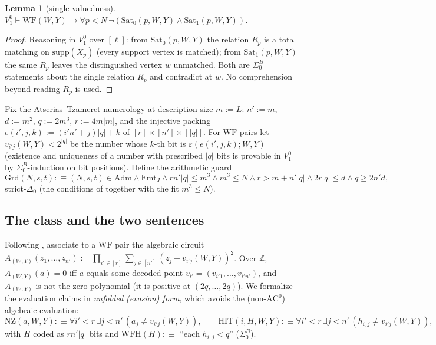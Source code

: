 \documentclass[11pt]{article}
\newtheorem{lemma}[theorem]{Lemma}
\theoremstyle{definition}
\theoremstyle{remark}
\newcommand{\Vone}{V^0_1}
\newcommand{\Sat}{\mathrm{Sat}}
\newcommand{\WF}{\mathrm{WF}}
\newcommand{\WFH}{\mathrm{WFH}}
\newcommand{\NZ}{\mathrm{NZ}}
\newcommand{\HIT}{\mathrm{HIT}}
\newcommand{\Grd}{\mathrm{Grd}}
\newcommand{\Adm}{\mathrm{Adm}}
\newcommand{\SigmaB}{\Sigma^B_0}
\begin{document}
\begin{lemma}[single-valuedness]\label{lem:mx}
$\Vone\vdash\WF(W,Y)\to\forall p<N\,\neg(\Sat_0(p,W,Y)\wedge\Sat_1(p,W,Y))$.
\end{lemma}
\begin{proof}
Reasoning in $\Vone$ over $[\ell]$: from $\Sat_0(p,W,Y)$ the relation $R_p$ is a
total matching on $\mathrm{supp}(X_p)$ (every support vertex is matched); from
$\Sat_1(p,W,Y)$ the same $R_p$ leaves the distinguished vertex $w$ unmatched.
Both are $\SigmaB$ statements about the single relation $R_p$ and contradict at
$w$. No comprehension beyond reading $R_p$ is used.
\end{proof}

Fix the Atserias--Tzameret numerology \cite[(38)]{AtseriasTzameret2025} at
description size $m:=L$: $n':=m$, $d:=m^2$, $q:=2m^3$, $r:=4m|m|$, and the
injective packing $e(i',j,k):=(i'n'+j)|q|+k$ of $[r]\times[n']\times[|q|]$. For
$\WF$ pairs let $v_{i'j}(W,Y)<2^{|q|}$ be the number whose $k$-th bit is
$\varepsilon(e(i',j,k);W,Y)$ (existence and uniqueness of a number with
prescribed $|q|$ bits is provable in $\Vone$ by $\SigmaB$-induction on bit
positions). Define the arithmetic guard
\[
  \Grd(N,s,t):\equiv (N,s,t)\in\Adm\wedge \mathrm{Fmt}_J
  \wedge r n'|q|\le m^3 \wedge m^3\le N \wedge r>m+n'|q| \wedge 2r|q|\le d \wedge q\ge 2n'd,
\]
strict-$\Delta_0$ (the conditions of \cite[(39)]{AtseriasTzameret2025} together
with the fit $m^3\le N$).

\subsection{The class and the two sentences}
Following \cite[(40)]{AtseriasTzameret2025}, associate to a $\WF$ pair the
algebraic circuit
$A_{(W,Y)}(z_1,\dots,z_{n'}):=\prod_{i'\in[r]}\sum_{j\in[n']}(z_j-v_{i'j}(W,Y))^2$.
Over $\mathbb Z$, $A_{(W,Y)}(a)=0$ iff $a$ equals some decoded point
$v_{i'}=(v_{i'1},\dots,v_{i'n'})$, and $A_{(W,Y)}$ is not the zero polynomial
(it is positive at $(2q,\dots,2q)$). We formalize the evaluation claims in
\emph{unfolded (evasion) form}, which avoids the (non-$\mathrm{AC}^0$) algebraic
evaluation:
\[
  \NZ(a,W,Y):\equiv \forall i'<r\,\exists j<n'\,(a_j\neq v_{i'j}(W,Y)),\qquad
  \HIT(i,H,W,Y):\equiv \forall i'<r\,\exists j<n'\,(h_{i,j}\neq v_{i'j}(W,Y)),
\]
with $H$ coded as $r n'|q|$ bits and $\WFH(H):\equiv$ ``each $h_{i,j}<q$''
($\SigmaB$).
\end{document}
